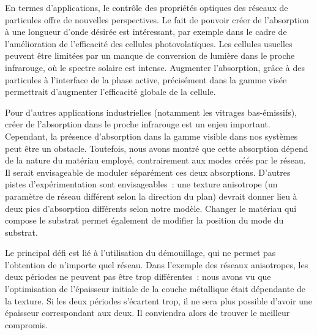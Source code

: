 En termes d'applications, le contrôle des propriétés optiques des réseaux de particules offre de nouvelles perspectives. Le fait de pouvoir créer de l'absorption à une longueur d'onde désirée est intéressant, par exemple dans le cadre de l'amélioration de l'efficacité des cellules photovolatïques. Les cellules usuelles peuvent être limitées par un manque de conversion de lumière dans le proche infrarouge, où le spectre solaire est intense. Augmenter l'absorption, grâce à des particules à l'interface de la phase active, précisément dans la gamme visée permettrait d'augmenter l'efficacité globale de la cellule.\par 
Pour d'autres applications industrielles (notamment les vitrages bas-émissifs), créer de l'absorption dans le proche infrarouge est un enjeu important. Cependant, la présence d'absorption dans la gamme visible dans nos systèmes peut être un obstacle. Toutefois, nous avons montré que cette absorption dépend de la nature du matériau employé, contrairement aux modes créés par le réseau. Il serait envisageable de moduler séparément ces deux absorptions. D'autres pistes d'expérimentation sont envisageables~: une texture anisotrope (un paramètre de réseau différent selon la direction du plan) devrait donner lieu à deux pics d'absorption différents selon notre modèle. Changer le matériau qui compose le substrat permet également de modifier la position du mode du substrat.\par 
Le principal défi est lié à l'utilisation du démouillage, qui ne permet pas l'obtention de n'importe quel réseau. Dans l'exemple des réseaux anisotropes, les deux périodes ne peuvent pas être trop différentes~: nous avons vu que l'optimisation de l'épaisseur initiale de la couche métallique était dépendante de la texture. Si les deux périodes s'écartent trop, il ne sera plus possible d'avoir une épaisseur correspondant aux deux. Il conviendra alors de trouver le meilleur compromis.\par 


\newpage


